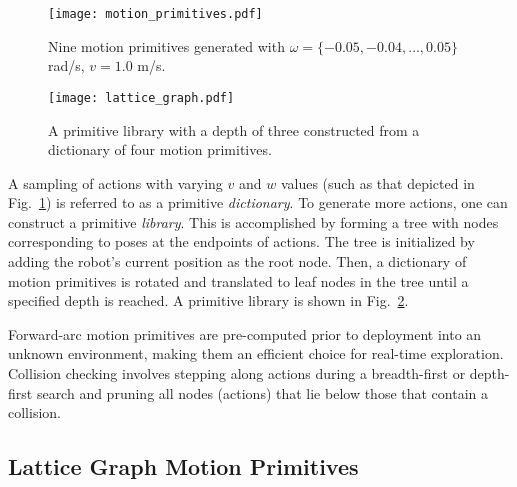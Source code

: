\begin{figure}[t]
  \centering
  \texttt{[image: motion\_primitives.pdf]}
  \caption[A forward-arc motion primitive dictionary.]{Nine motion primitives generated with $\omega = \{-0.05, -0.04,
  \dots, 0.05\}$ rad/s, $v = 1.0$ m/s.\label{fig:motion_prims}}
\end{figure}
\begin{figure}[h]
    \centering
    \texttt{[image: lattice\_graph.pdf]}
    \caption[A forward-arc motion primitive library.]{A primitive library with a depth of three constructed from a
    dictionary of four motion primitives. \label{fig:primitive_library}}
\end{figure}

A sampling of actions with varying $v$ and $w$ values (such as that depicted in
Fig.~\ref{fig:motion_prims}) is referred to as a
primitive \textit{dictionary}. To generate more actions, one can construct a
primitive \textit{library}. This is accomplished by forming a tree with nodes
corresponding to poses at the endpoints of actions. The tree is initialized by adding
the robot's current position as the root node. Then, a dictionary of motion
primitives is rotated and translated to leaf nodes in the tree until a specified
depth is reached. A primitive library is shown in
Fig.~\ref{fig:primitive_library}.
%

Forward-arc motion primitives are pre-computed prior to deployment into an
unknown environment, making them an efficient choice for real-time exploration. Collision
checking involves stepping along actions during a breadth-first or depth-first search and
pruning all nodes (actions) that lie below those that contain a collision.

\subsection{Lattice Graph Motion Primitives}
\label{subsec:lg_motion_primitives}

